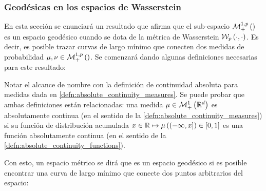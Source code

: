 \subsubsection{Geodésicas en los espacios de Wasserstein}

En esta sección se enunciará un resultado que afirma que el sub-espacio $\mathcal{M}_+^{1,p}\left(\right)$ es un espacio geodésico cuando se dota de la métrica de Wasserstein $\mathcal{W}_{p}\left(\cdot,\cdot\right)$. Es decir, es posible trazar curvas de largo mínimo que conecten dos medidas de probabilidad $\mu,\nu\in\mathcal{M}_+^{1,p}\left(\right)$. Se comenzará dando algunas definiciones necesarias para este resultado:


\begin{defn}
	\label{defn:absolute_continuity_functions}
\end{defn}

Notar el alcance de nombre con la definición de continuidad absoluta para medidas dada en \autoref{defn:absolute_continuity_measures}. Se puede probar que ambas definiciones están relacionadas: una medida $\mu\in\mathcal{M}_+^1\left(\mathbb{R}^d\right)$ es absolutamente continua (en el sentido de la \autoref{defn:absolute_continuity_measures}) si su función de distribución acumulada $x\in\mathbb{R}\mapsto \mu\left((-\infty,x]\right)\in[0,1]$ es una función absolutamente continua (en el sentido de la \autoref{defn:absolute_continuity_functions}).

Con esto, un espacio métrico se dirá que es un espacio geodésico si es posible encontrar una curva de largo mínimo que conecte dos puntos arbitrarios del espacio:

